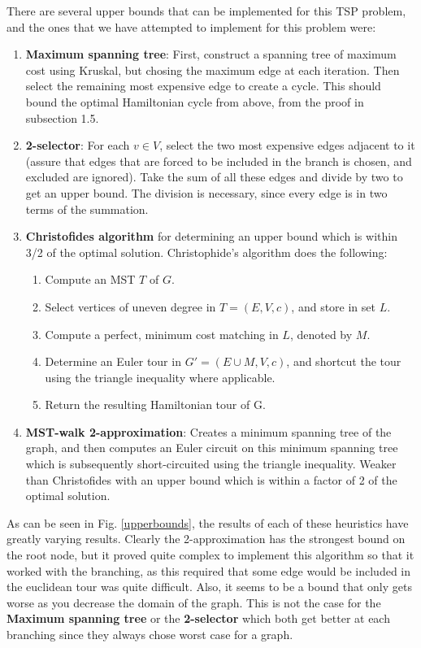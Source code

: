 \documentclass[12pt]{article}
\begin{document}
There are several upper bounds that can be implemented for this TSP problem, and the ones that we have attempted to implement for this problem were:
\begin{enumerate}
\item {\bf Maximum spanning tree}: First, construct a spanning tree of maximum cost using Kruskal, but chosing the maximum edge at each iteration. Then select the remaining most expensive edge to create a cycle. This should bound the optimal Hamiltonian cycle from above, from the proof in subsection 1.5.
\item {\bf 2-selector}: For each $v\in V$, select the two most expensive edges adjacent to it (assure that edges that are forced to be included in the branch is chosen, and excluded are ignored). Take the sum of all these edges and divide by two to get an upper bound. The division is necessary, since every edge is in two terms of the summation.
\item {\bf Christofides algorithm} for determining an upper bound which is within 3/2 of the optimal solution. Christophide's algorithm does the following:
\begin{enumerate}
\item Compute an MST $T$ of $G$.
\item Select vertices of uneven degree in $T=(E, V, c)$, and store in set $L$.
\item Compute a perfect, minimum cost matching in $L$, denoted by $M$.
\item Determine an Euler tour in $G'=(E \cup M, V, c)$, and shortcut the tour using the triangle inequality where applicable.
\item Return the resulting Hamiltonian tour of G.
\end{enumerate}
\item {\bf MST-walk 2-approximation}: Creates a minimum spanning tree of the graph, and then computes an Euler circuit on this minimum spanning tree which is subsequently short-circuited using the triangle inequality. Weaker than Christofides with an upper bound which is within a factor of 2 of the optimal solution.
\end{enumerate}

As can be seen in Fig. \ref{upperbounds}, the results of each of these heuristics have greatly varying results. Clearly the 2-approximation has the strongest bound on the root node, but it proved quite complex to implement this algorithm so that it worked with the branching, as this required that some edge would be included in the euclidean tour was quite difficult. Also, it seems to be a bound that only gets worse as you decrease the domain of the graph. This is not the case for the {\bf Maximum spanning tree} or the {\bf 2-selector} which both get better at each branching since they always chose worst case for a graph.\\
\end{document}
